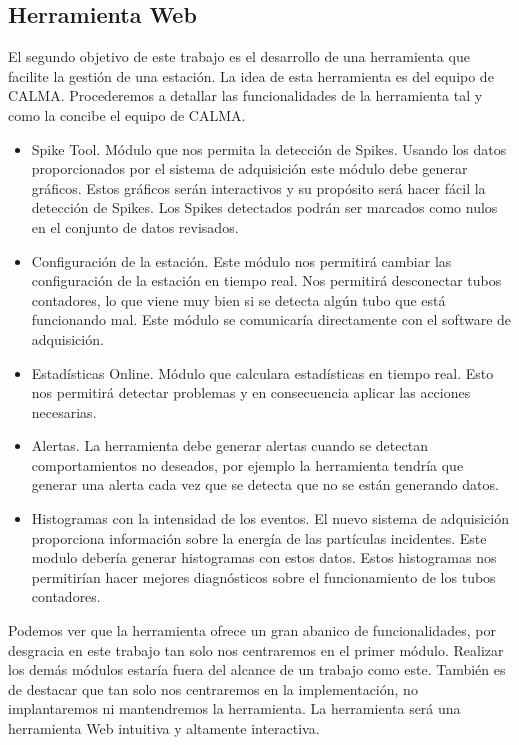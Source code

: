 	\subsection{Herramienta Web}
		El segundo objetivo de este trabajo es el desarrollo de una herramienta que facilite la gestión de una estación. La idea de esta
		herramienta es del equipo de CALMA. Procederemos a detallar las funcionalidades de la herramienta tal y como la concibe el equipo de
		CALMA.
		\begin{itemize}
	         	\item	Spike Tool. Módulo que nos permita la detección de Spikes. Usando los datos proporcionados por el sistema de
			  	adquisición este módulo debe generar gráficos. Estos gráficos serán interactivos y su propósito será hacer fácil la
				detección de Spikes. Los Spikes detectados podrán ser marcados como nulos en el conjunto de datos revisados. 
			\item 	Configuración de la estación. Este módulo nos permitirá cambiar las configuración de la estación en tiempo real. Nos
			  	permitirá desconectar tubos contadores, lo que viene muy bien si se detecta algún tubo que está funcionando mal. Este
				módulo se comunicaría directamente con el software de adquisición. 
			\item 	Estadísticas Online. Módulo que calculara estadísticas en tiempo real. Esto nos permitirá detectar problemas y en
			  	consecuencia aplicar las acciones necesarias. 
			\item	Alertas. La herramienta debe generar alertas cuando se detectan comportamientos no deseados, por ejemplo la
			  	herramienta tendría que generar una alerta cada vez que se detecta que no se están generando datos.
			\item 	Histogramas con la intensidad de los eventos. El nuevo sistema de adquisición proporciona información sobre la energía
			  	de las partículas incidentes. Este modulo debería generar histogramas con estos datos. Estos histogramas nos
				permitirían hacer mejores diagnósticos sobre el funcionamiento de los tubos contadores. 
		\end{itemize}
		Podemos ver que la herramienta ofrece un gran abanico de funcionalidades, por desgracia en este trabajo tan solo nos centraremos en el
		primer módulo. Realizar los demás módulos estaría fuera del alcance de un trabajo como este. También es de destacar que tan solo
		nos centraremos en la implementación, no implantaremos ni mantendremos la herramienta. La herramienta será una herramienta Web 
		intuitiva y altamente interactiva. 
		

